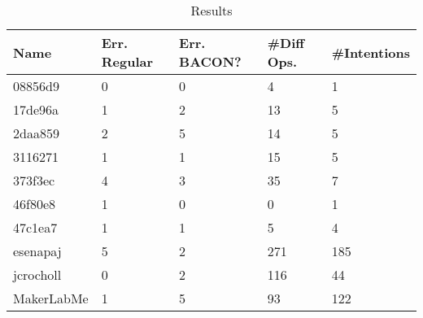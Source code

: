 \begin{table}[h]
    \centering
    \caption{Results}
    \label{tab:internalres}
    \begin{tabular}{l|llll}
\hline\hline
\textbf{Name} & \textbf{Err. Regular} & \textbf{Err. BACON?} & \textbf{\#Diff Ops.} & \textbf{\#Intentions}\\
\hline
08856d9      & 0     & 0     & 4     & 1     \\
17de96a      & 1     & 2     & 13    & 5     \\
2daa859      & 2     & 5     & 14    & 5     \\
3116271      & 1     & 1     & 15    & 5     \\
373f3ec      & 4     & 3     & 35    & 7     \\
46f80e8      & 1     & 0     & 0     & 1     \\
47c1ea7      & 1     & 1     & 5     & 4     \\
\hline
esenapaj     & 5     & 2     & 271   & 185   \\ %
jcrocholl    & 0     & 2     & 116   & 44    \\
MakerLabMe   & 1     & 5     & 93    & 122   \\ %
\hline\hline
    \end{tabular}
\end{table}


\section{\RQA}


\section{\RQB}


\section{\RQC}

